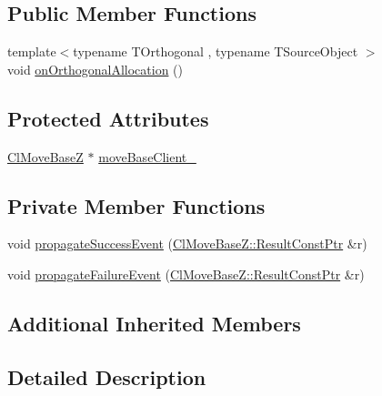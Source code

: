 \subsection*{Public Member Functions}
\begin{DoxyCompactItemize}
\item 
{\footnotesize template$<$typename T\+Orthogonal , typename T\+Source\+Object $>$ }\\void \hyperlink{classcl__move__base__z_1_1CbMoveBaseClientBehaviorBase_ae9e4d5856a88c367edd755cdd00b377f}{on\+Orthogonal\+Allocation} ()
\end{DoxyCompactItemize}
\subsection*{Protected Attributes}
\begin{DoxyCompactItemize}
\item 
\hyperlink{classcl__move__base__z_1_1ClMoveBaseZ}{Cl\+Move\+BaseZ} $\ast$ \hyperlink{classcl__move__base__z_1_1CbMoveBaseClientBehaviorBase_ab2ef219464cfac8659b4a87c8d0db6d5}{move\+Base\+Client\+\_\+}
\end{DoxyCompactItemize}
\subsection*{Private Member Functions}
\begin{DoxyCompactItemize}
\item 
void \hyperlink{classcl__move__base__z_1_1CbMoveBaseClientBehaviorBase_a12109fd9132a93140e4f022ee052e2ed}{propagate\+Success\+Event} (\hyperlink{classcl__move__base__z_1_1ClMoveBaseZ_a99373d0c15ae96684462d8677f5fd632}{Cl\+Move\+Base\+Z\+::\+Result\+Const\+Ptr} \&r)
\item 
void \hyperlink{classcl__move__base__z_1_1CbMoveBaseClientBehaviorBase_a8a1d14d98893dc21c4cb2b28c35e9b09}{propagate\+Failure\+Event} (\hyperlink{classcl__move__base__z_1_1ClMoveBaseZ_a99373d0c15ae96684462d8677f5fd632}{Cl\+Move\+Base\+Z\+::\+Result\+Const\+Ptr} \&r)
\end{DoxyCompactItemize}
\subsection*{Additional Inherited Members}


\subsection{Detailed Description}


